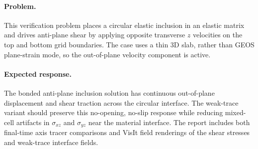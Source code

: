 \paragraph{Problem.}
This verification problem places a circular elastic inclusion in an elastic
matrix and drives anti-plane shear by applying opposite transverse $z$ velocities
on the top and bottom grid boundaries.  The case uses a thin 3D slab, rather
than GEOS plane-strain mode, so the out-of-plane velocity component is active.

\paragraph{Expected response.}
The bonded anti-plane inclusion solution has continuous out-of-plane
displacement and shear traction across the circular interface.  The weak-trace
variant should preserve this no-opening, no-slip response while reducing
mixed-cell artifacts in $\sigma_{xz}$ and $\sigma_{yz}$ near the material
interface.  The report includes both final-time axis tracer comparisons and
VisIt field renderings of the shear stresses and weak-trace interface fields.

